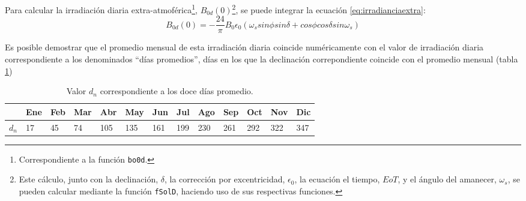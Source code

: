 Para calcular la irradiación diaria extra-atmoférica\footnote{Correspondiente a la función \texttt{bo0d}.}, \(B_{0d}(0)\)\footnote{Este cálculo, junto con la declinación, \(\delta\), la corrección por excentricidad, \(\epsilon_0\), la ecuación el tiempo, \(EoT\), y el ángulo del amanecer, \(\omega_s\), se pueden calcular mediante la función \texttt{fSolD}, haciendo uso de sus respectivas funciones.}, se puede integrar la ecuación \ref{eq:irradianciaextra}:
\begin{equation}
B_{0d}(0)=-\frac{24}{\pi}B_0\epsilon_0(\omega_s sin\phi sin\delta + cos\phi cos\delta sin \omega_s)
\label{eq:irradiacionextra}
\end{equation}

Es posible demostrar que el promedio mensual de esta irradiación diaria coincide numéricamente con el valor de irradiación diaria correspondiente a los denominados ``días promedios'', días en los que la declinación correpondiente coincide con el promedio mensual (tabla \ref{tab:DiasPromedio})
\begin{center}
{\footnotesize }%
\begin{table}[h]
{\footnotesize \caption{Valor $d_{n}$ correspondiente a los doce días promedio.\label{tab:DiasPromedio}}
}{\footnotesize \par}

\centering{}{\footnotesize }\begin{tabular}{>{\centering}p{6mm}>{\centering}m{4mm}>{\centering}m{4mm}>{\centering}m{4mm}>{\centering}m{4mm}>{\centering}m{4mm}>{\centering}m{4mm}>{\centering}m{4mm}>{\centering}m{4mm}>{\centering}m{4mm}>{\centering}m{4mm}>{\centering}m{4mm}>{\centering}m{3mm}}
\toprule 
{\footnotesize Mes} & {\footnotesize Ene} & {\footnotesize Feb} & {\footnotesize Mar} & {\footnotesize Abr} & {\footnotesize May} & {\footnotesize Jun} & {\footnotesize Jul} & {\footnotesize Ago} & {\footnotesize Sep} & {\footnotesize Oct} & {\footnotesize Nov} & {\footnotesize Dic}\tabularnewline
\midrule
$d_{n}$ & {\footnotesize 17} & {\footnotesize 45} & {\footnotesize 74} & {\footnotesize 105} & {\footnotesize 135} & {\footnotesize 161} & {\footnotesize 199} & {\footnotesize 230} & {\footnotesize 261} & {\footnotesize 292} & {\footnotesize 322} & {\footnotesize 347}\tabularnewline
\bottomrule
\end{tabular}
\end{table}

\par\end{center}{\footnotesize \par}

